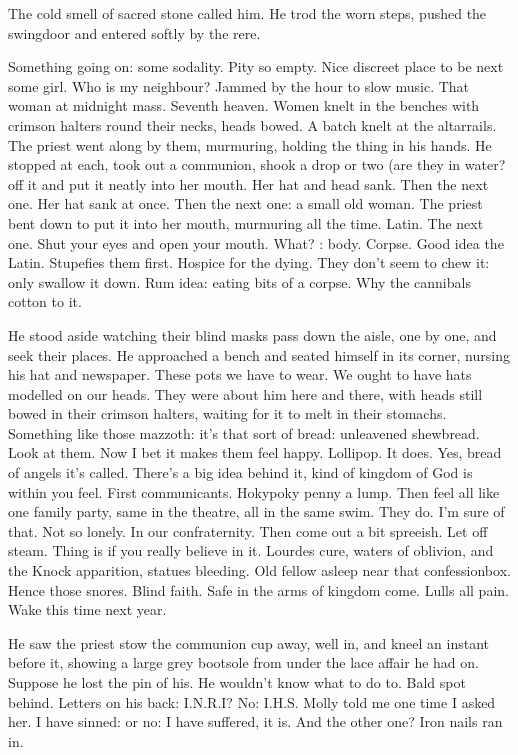 The cold smell of sacred stone called him.
He trod the worn steps,
pushed the swingdoor
and entered softly by the rere.

Something going on: some sodality.
Pity so empty.
Nice discreet place to be next some girl.
Who is my neighbour?
Jammed by the hour to slow music.
That woman at midnight mass.
Seventh heaven.
Women knelt in the benches with crimson halters round their necks,
heads bowed.
A batch knelt at the altarrails.
The priest went along by them, murmuring,
holding the thing in his hands.
He stopped at each, took out a communion,
shook a drop or two (are they in water?
off it and put it neatly into her mouth.
Her hat and head sank.
Then the next one.
Her hat sank at once.
Then the next one:
a small old woman.
The priest bent down to put it into her mouth,
murmuring all the time.
Latin.
The next one.
Shut your eyes and open your mouth.
What?
:
body.
Corpse.
Good idea the Latin.
Stupefies them first.
Hospice for the dying.
They don't seem to chew it:
only swallow it down.
Rum idea:
eating bits of a corpse.
Why the cannibals cotton to it.

He stood aside watching their blind masks pass down the aisle, one by
one, and seek their places. He approached a bench and seated himself in
its corner, nursing his hat and newspaper. These pots we have to wear. We
ought to have hats modelled on our heads. They were about him here and
there, with heads still bowed in their crimson halters, waiting for it to
melt in their stomachs. Something like those mazzoth: it's that sort of
bread: unleavened shewbread. Look at them. Now I bet it makes them feel
happy. Lollipop. It does. Yes, bread of angels it's called. There's a big
idea behind it, kind of kingdom of God is within you feel. First
communicants. Hokypoky penny a lump. Then feel all like one family party,
same in the theatre, all in the same swim. They do. I'm sure of that. Not
so lonely. In our confraternity. Then come out a bit spreeish. Let off
steam. Thing is if you really believe in it. Lourdes cure, waters of
oblivion, and the Knock apparition, statues bleeding. Old fellow asleep
near that confessionbox. Hence those snores. Blind faith. Safe in the arms
of kingdom come. Lulls all pain. Wake this time next year.

He saw the priest stow the communion cup away, well in, and kneel
an instant before it, showing a large grey bootsole from under the lace
affair he had on. Suppose he lost the pin of his. He wouldn't know what to
do to. Bald spot behind. Letters on his back: I.N.R.I? No: I.H.S.
Molly told me one time I asked her. I have sinned: or no: I have suffered,
it is. And the other one? Iron nails ran in.

